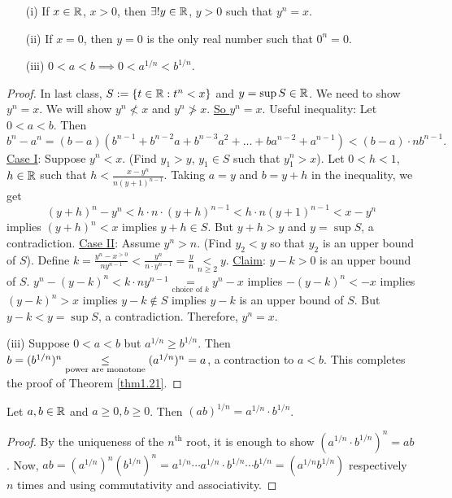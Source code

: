 \documentclass[]{article}
\begin{document}
\begin{recall}
	\begin{enumerate}
		\item[(i)] If $x\in \mathbb{R}$, $x>0$, then $\exists! y\in\mathbb{R}$, $y>0$ such that $y^n = x$.
		\item[(ii)] If $x=0$, then $y=0$ is the only real number such that $0^n = 0$.
		\item[(iii)] $0<a<b\implies 0<a^{1/n}<b^{1/n}$.
	\end{enumerate}
\end{recall}
\begin{proof}
	In last class, $S := \{t\in \mathbb{R}: t^n < x\}$ and $y = \sup S\in\mathbb{R}$. We need to show $y^n = x$. We will show $y^n \nless x$ and $y^n \ngtr x$. \ul{So $y^n = x$}.
	Useful inequality: Let $0<a<b$. Then $$b^n - a^n = (b-a)(b^{n-1}+b^{n-2}a + b^{n-3}a^2 + \dots + ba^{n-2} + a^{n-1}) < (b-a)\cdot nb^{n-1}.$$
	\ul{Case I}: Suppose $y^n < x$. (Find $y_1>y$, $y_1\in S$ such that $y_1^n > x$). Let $0<h<1$, $h\in\mathbb{R}$ such that $h< \frac{x-y^n}{n(y+1)^{n-1}}$. Taking $a = y$ and $b= y+h$ in the inequality, we get $$(y+h)^n - y^n < h\cdot n\cdot (y+h)^{n-1} < h\cdot n(y+1)^{n-1} < x-y^n$$ implies $(y+h)^n < x$ implies $y+h\in S$. But $y+h>y$ and $y=\sup S$, a contradiction.
	\ul{Case II}: Assume $y^n > n$. (Find $y_2 < y$ so that $y_2$ is an upper bound of $S$). Define $k = \frac{y^n - x^{>0}}{ny^{n-1}} < \frac{y^n}{n\cdot y^{n-1}} = \frac{y}{n} \underset{n\geq 2}{<} y$. \ul{Claim}: $y - k > 0$ is an upper bound of $S$. $y^n - (y-k)^n < k\cdot n y^{n-1} \underset{\text{choice of }k}{=} y^n - x$ implies $-(y-k)^n < -x$ implies $(y-k)^n > x$ implies $y-k\notin S$ implies $y-k$ is an upper bound of $S$. But $y-k<y = \sup S$, a contradiction. Therefore, $y^n = x$.
	
	(iii) Suppose $0<a<b$ but $a^{1/n}\geq b^{1/n}$. Then $b = (b^{1/n})^n \underset{\text{power are monotone}}{\leq} (a^{1/n})^n = a$, a contraction to $a<b$. This completes the proof of Theorem \ref{thm1.21}.
\end{proof}
\begin{corollary}
	Let $a,b\in\mathbb{R}$ and $a\geq 0,b\geq 0$. Then $(ab)^{1/n} = a^{1/n}\cdot b^{1/n}$.
\end{corollary}
\begin{proof}
	By the uniqueness of the $n^\text{th}$ root, it is enough to show $(a^{1/n}\cdot b^{1/n})^n = ab$. Now, $ab = (a^{1/n})^n (b^{1/n})^n = a^{1/n}\cdots a^{1/n}\cdot b^{1/n}\cdots b^{1/n} = (a^{1/n}b^{1/n})$ respectively $n$ times and using commutativity and associativity.
\end{proof}
\end{document}
